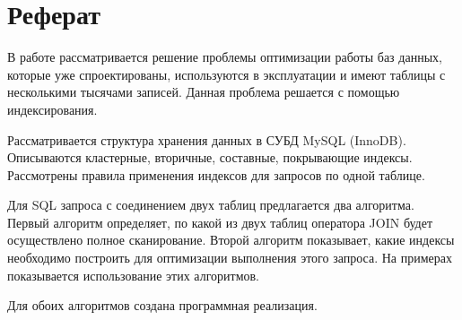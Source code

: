 \chapter{Реферат}

В работе рассматривается решение проблемы оптимизации работы баз данных, которые уже спроектированы, используются в эксплуатации и имеют таблицы с несколькими тысячами записей. Данная проблема решается с помощью индексирования. 

Рассматривается структура хранения данных в СУБД MySQL (InnoDB). Описываются кластерные, вторичные, составные, покрывающие индексы. Рассмотрены правила применения индексов для запросов по одной таблице. 

Для SQL запроса с соединением двух таблиц предлагается два алгоритма. Первый алгоритм определяет, по какой из двух таблиц оператора JOIN будет осуществлено полное сканирование. Второй алгоритм показывает, какие индексы необходимо построить для оптимизации выполнения этого запроса. На примерах показывается использование этих алгоритмов. 

Для обоих алгоритмов создана программная реализация.